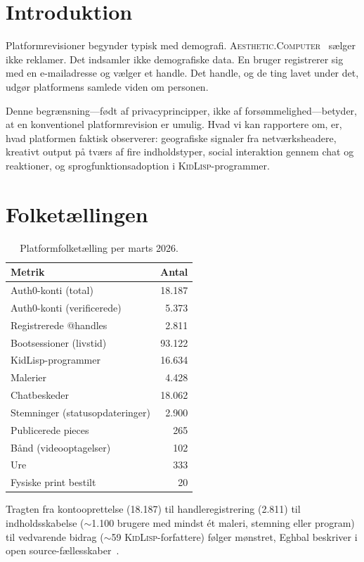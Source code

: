 \documentclass[10pt,letterpaper,twocolumn]{article}
\newcommand{\ac}{\textsc{Aesthetic.Computer}}
\newcommand{\kl}{\textsc{KidLisp}}
\begin{document}
\section{Introduktion}

Platformrevisioner begynder typisk med demografi. \ac{}~\citep{scudder2026ac} sælger ikke reklamer. Det indsamler ikke demografiske data. En bruger registrerer sig med en e-mailadresse og vælger et handle. Det handle, og de ting lavet under det, udgør platformens samlede viden om personen.

Denne begrænsning---født af privacyprincipper, ikke af forsømmelighed---betyder, at en konventionel platformrevision er umulig. Hvad vi kan rapportere om, er, hvad platformen faktisk observerer: geografiske signaler fra netværksheadere, kreativt output på tværs af fire indholdstyper, social interaktion gennem chat og reaktioner, og sprogfunktionsadoption i \kl{}-programmer.

\section{Folketællingen}

\begin{table}[h]
\small\centering
\begin{tabularx}{\columnwidth}{Xr}
\toprule
\textbf{Metrik} & \textbf{Antal} \\
\midrule
Auth0-konti (total) & 18.187 \\
Auth0-konti (verificerede) & 5.373 \\
Registrerede @handles & 2.811 \\
Bootsessioner (livstid) & 93.122 \\
\midrule
KidLisp-programmer & 16.634 \\
Malerier & 4.428 \\
Chatbeskeder & 18.062 \\
Stemninger (statusopdateringer) & 2.900 \\
Publicerede pieces & 265 \\
Bånd (videooptagelser) & 102 \\
Ure & 333 \\
Fysiske print bestilt & 20 \\
\bottomrule
\end{tabularx}
\caption{Platformfolketælling per marts 2026.}
\label{tab:census}
\end{table}

Tragten fra kontooprettelse (18.187) til handleregistrering (2.811) til indholdsskabelse ($\sim$1.100 brugere med mindst ét maleri, stemning eller program) til vedvarende bidrag ($\sim$59 \kl{}-forfattere) følger mønstret, Eghbal beskriver i open source-fællesskaber~\citep{eghbal2020working}.
\end{document}
